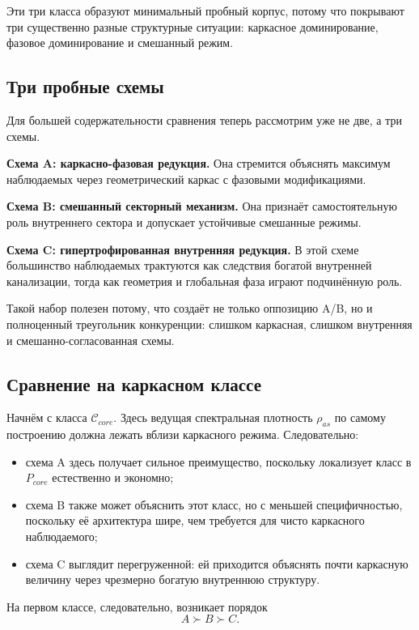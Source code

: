 \documentclass[12pt,a4paper]{article}
\begin{document}
Эти три класса образуют минимальный пробный корпус, потому что покрывают три существенно разные структурные ситуации: каркасное доминирование, фазовое доминирование и смешанный режим.

\subsection{Три пробные схемы}

Для большей содержательности сравнения теперь рассмотрим уже не две, а три схемы.

\textbf{Схема A: каркасно-фазовая редукция.} Она стремится объяснять максимум наблюдаемых через геометрический каркас с фазовыми модификациями.

\textbf{Схема B: смешанный секторный механизм.} Она признаёт самостоятельную роль внутреннего сектора и допускает устойчивые смешанные режимы.

\textbf{Схема C: гипертрофированная внутренняя редукция.} В этой схеме большинство наблюдаемых трактуются как следствия богатой внутренней канализации, тогда как геометрия и глобальная фаза играют подчинённую роль.

Такой набор полезен потому, что создаёт не только оппозицию A/B, но и полноценный треугольник конкуренции: слишком каркасная, слишком внутренняя и смешанно-согласованная схемы.

\subsection{Сравнение на каркасном классе}

Начнём с класса \(\mathcal{C}_{core}\). Здесь ведущая спектральная плотность \(\rho_{as}\) по самому построению должна лежать вблизи каркасного режима. Следовательно:
\begin{itemize}
    \item схема A здесь получает сильное преимущество, поскольку локализует класс в \(P_{core}\) естественно и экономно;
    \item схема B также может объяснить этот класс, но с меньшей специфичностью, поскольку её архитектура шире, чем требуется для чисто каркасного наблюдаемого;
    \item схема C выглядит перегруженной: ей приходится объяснять почти каркасную величину через чрезмерно богатую внутреннюю структуру.
\end{itemize}

На первом классе, следовательно, возникает порядок
\begin{equation}
A \succ B \succ C.
\end{equation}
\end{document}

